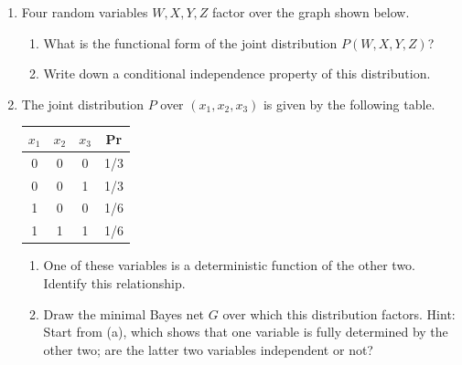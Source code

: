 \documentclass[11pt]{article}
\begin{document}
\begin{enumerate}
\begin{enumerate}
\item Is $C$ conditionally independent of $A$ given $B$ (i.e., is it true that $\Pr(C = c|A = a, B = b) = \Pr(C = c|B = b)$)? Give a brief reason.

\item Draw an undirected graphical model for $(A, B, C)$.
\end{enumerate}

\newpage

\item Four random variables $W, X, Y, Z$ factor over the graph shown below.

\begin{center}
\end{center}

\begin{enumerate}
\item What is the functional form of the joint distribution $P(W, X, Y, Z)$?

\item Write down a conditional independence property of this distribution.
\end{enumerate}

\item The joint distribution $P$ over $(x_1, x_2, x_3)$ is given by the following table.

\begin{center}
\begin{tabular}{c|c|c|c}
$x_1$ & $x_2$ & $x_3$ & Pr \\\hline
0 & 0 & 0 & 1/3 \\
0 & 0 & 1 & 1/3 \\
1 & 0 & 0 & 1/6 \\
1 & 1 & 1 & 1/6
\end{tabular}
\end{center}

\begin{enumerate}
\item One of these variables is a deterministic function of the other two. Identify this relationship.

\item Draw the minimal Bayes net $G$ over which this distribution factors. Hint: Start from (a), which shows that one variable is fully determined by the other two; are the latter two variables independent or not?


\end{enumerate}
\end{enumerate}
\end{document}

